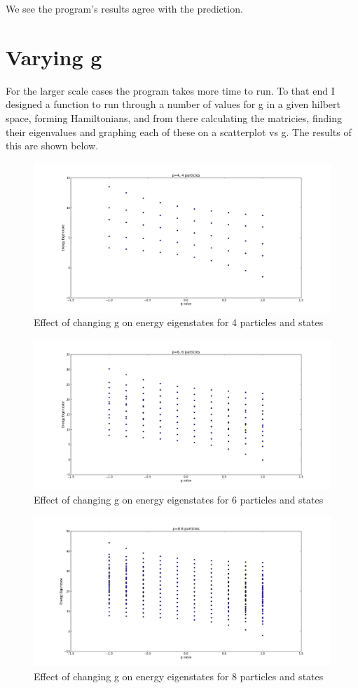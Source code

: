 \documentclass[11pt]{article} %
\begin{document}
We see the program's results agree with the prediction. \\
\section{Varying g}

For the larger scale cases the program takes more time to run. To that end I designed a function to run through a number of values for g in a given hilbert space, forming Hamiltonians, and from there calculating the matricies, finding their eigenvalues and graphing each of these on a scatterplot vs g. The results of this are shown below.
\FloatBarrier
\begin{figure}[hbt!]
\centering
\includegraphics[width=.7\linewidth]{p4p4}
\caption{Effect of changing g on energy eigenstates for 4 particles and states}
\end{figure}
\FloatBarrier

\FloatBarrier
\begin{figure}[hbt!]
\centering
\includegraphics[width=.7\linewidth]{p6p6}
\caption{Effect of changing g on energy eigenstates for 6 particles and states}
\end{figure}
\FloatBarrier


\FloatBarrier
\begin{figure}[hbt!]
\centering
\includegraphics[width=.7\linewidth]{p8p8}
\caption{Effect of changing g on energy eigenstates for 8 particles and states}
\end{figure}
\FloatBarrier
\end{document}
